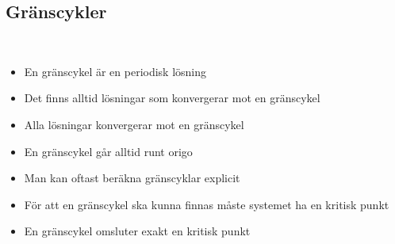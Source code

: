 \subsection{Gränscykler}\hfill\\

\begin{itemize}
  \item En gränscykel är en periodisk lösning
  \item Det finns alltid lösningar som konvergerar mot en gränscykel
  \item Alla lösningar konvergerar mot en gränscykel
  \item En gränscykel går alltid runt origo
  \item Man kan oftast beräkna gränscyklar explicit
  \item För att en gränscykel ska kunna finnas måste systemet ha en kritisk punkt
  \item En gränscykel omsluter exakt en kritisk punkt 
\end{itemize}
